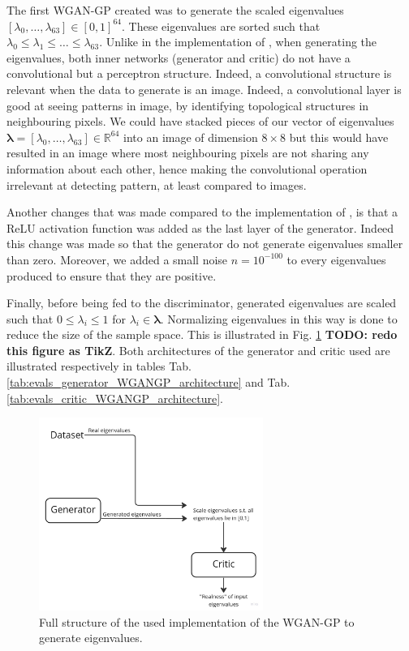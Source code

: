 \documentclass[11pt,a4paper,twoside]{report}
\begin{document}
The first WGAN-GP created was to generate the scaled eigenvalues $[\lambda_0, \dots, \lambda_{63}] \in [0,1]^{64}$. These eigenvalues are sorted such that $\lambda_0 \leq \lambda_1 \leq \dots \leq \lambda_{63}$. Unlike in the implementation of \cite{nain2020wgangp}, when generating the eigenvalues, both inner networks (generator and critic) do not have a convolutional but a perceptron structure. Indeed, a convolutional structure is relevant when the data to generate is an image. Indeed, a convolutional layer is good at seeing patterns in image, by identifying topological structures in neighbouring pixels. We could have stacked pieces of our vector of eigenvalues $\mathbf{\lambda} = [\lambda_0, \dots, \lambda_{63}] \in \mathbb{R}^{64}$  into an image of dimension $8 \times 8$ but this would have resulted in an image where most neighbouring pixels are not sharing any information about each other, hence making the convolutional operation irrelevant at detecting pattern, at least compared to images. 

Another changes that was made compared to the implementation of \cite{nain2020wgangp}, is that a ReLU activation function was added as the last layer of the generator. Indeed this change was made so that the generator do not generate eigenvalues smaller than zero. Moreover, we added a small noise $n = 10^{-100}$ to every eigenvalues produced to ensure that they are positive.

Finally, before being fed to the discriminator, generated eigenvalues are scaled such that $0 \leq \lambda_i \leq 1$ for $\lambda_i \in \mathbf{\lambda}$. Normalizing eigenvalues in this way is done to reduce the size of the sample space. This is illustrated in Fig. \ref{fig:flowchart_evals_wgangp} \textbf{TODO: redo this figure as TikZ}. Both architectures of the generator and critic used are illustrated respectively in tables Tab.\ref{tab:evals_generator_WGANGP_architecture} and Tab.\ref{tab:evals_critic_WGANGP_architecture}.

\begin{figure}
    \centering
    \includegraphics[width=0.65\textwidth]{figs/flowchart_evals_wgangp.jpg}
    \caption{Full structure of the used implementation of the WGAN-GP to generate eigenvalues.}
    \label{fig:flowchart_evals_wgangp}
\end{figure}
\end{document}
